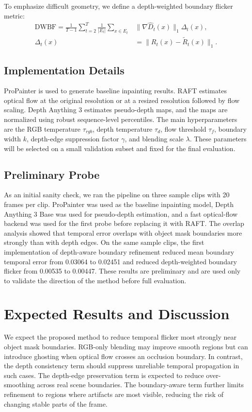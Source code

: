 \documentclass[nouppercase]{kaia}
\begin{document}
To emphasize difficult geometry, we define a depth-weighted boundary flicker metric:
\begin{equation}
    \begin{aligned}
    \text{DWBF} = \frac{1}{T-1}\sum_{t=2}^{T} \frac{1}{|E_t|}
    \sum_{x \in E_t} &\lVert \nabla \hat{D}_t(x) \rVert_1 \Delta_t(x),\\
    \Delta_t(x) &= \lVert R_t(x)-\widetilde{R}_t(x) \rVert_1.
    \end{aligned}
\end{equation}

\subsection{Implementation Details}
ProPainter is used to generate baseline inpainting results. RAFT estimates optical flow at the original resolution or at a resized resolution followed by flow scaling. Depth Anything 3 estimates pseudo-depth maps, and the maps are normalized using robust sequence-level percentiles. The main hyperparameters are the RGB temperature $\tau_{rgb}$, depth temperature $\tau_d$, flow threshold $\tau_f$, boundary width $k$, depth-edge suppression factor $\gamma$, and blending scale $\lambda$. These parameters will be selected on a small validation subset and fixed for the final evaluation.

\subsection{Preliminary Probe}
As an initial sanity check, we ran the pipeline on three sample clips with 20 frames per clip. ProPainter was used as the baseline inpainting model, Depth Anything 3 Base was used for pseudo-depth estimation, and a fast optical-flow backend was used for the first probe before replacing it with RAFT. The overlap analysis showed that temporal error overlaps with object mask boundaries more strongly than with depth edges. On the same sample clips, the first implementation of depth-aware boundary refinement reduced mean boundary temporal error from 0.03064 to 0.02451 and reduced depth-weighted boundary flicker from 0.00535 to 0.00447. These results are preliminary and are used only to validate the direction of the method before full evaluation.

\section{Expected Results and Discussion}
We expect the proposed method to reduce temporal flicker most strongly near object mask boundaries. RGB-only blending may improve smooth regions but can introduce ghosting when optical flow crosses an occlusion boundary. In contrast, the depth consistency term should suppress unreliable temporal propagation in such cases. The depth-edge preservation term is expected to reduce over-smoothing across real scene boundaries. The boundary-aware term further limits refinement to regions where artifacts are most visible, reducing the risk of changing stable parts of the frame.
\end{document}
